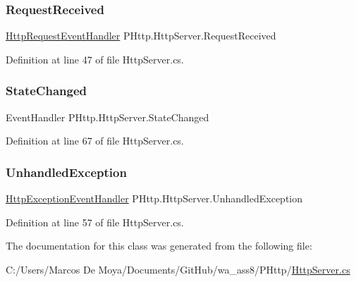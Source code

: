 \subsubsection{\texorpdfstring{Request\+Received}{RequestReceived}}
{\footnotesize\ttfamily \hyperlink{namespace_p_http_a746b16e27637dd7ea95bb9256e7a93ff}{Http\+Request\+Event\+Handler} P\+Http.\+Http\+Server.\+Request\+Received}



Definition at line 47 of file Http\+Server.\+cs.

\mbox{\label{class_p_http_1_1_http_server_a2a33f616b3d6fc6df79ec3c23f562a4b}} 
\subsubsection{\texorpdfstring{State\+Changed}{StateChanged}}
{\footnotesize\ttfamily Event\+Handler P\+Http.\+Http\+Server.\+State\+Changed}



Definition at line 67 of file Http\+Server.\+cs.

\mbox{\label{class_p_http_1_1_http_server_a08a7e838dc1d9c70ffa94ffce48a4533}} 
\subsubsection{\texorpdfstring{Unhandled\+Exception}{UnhandledException}}
{\footnotesize\ttfamily \hyperlink{namespace_p_http_a3004f4a8bbd5aaf98c00d1771384224f}{Http\+Exception\+Event\+Handler} P\+Http.\+Http\+Server.\+Unhandled\+Exception}



Definition at line 57 of file Http\+Server.\+cs.



The documentation for this class was generated from the following file\+:\begin{DoxyCompactItemize}
\item 
C\+:/\+Users/\+Marcos De Moya/\+Documents/\+Git\+Hub/wa\+\_\+ass8/\+P\+Http/\hyperlink{_http_server_8cs}{Http\+Server.\+cs}\end{DoxyCompactItemize}
